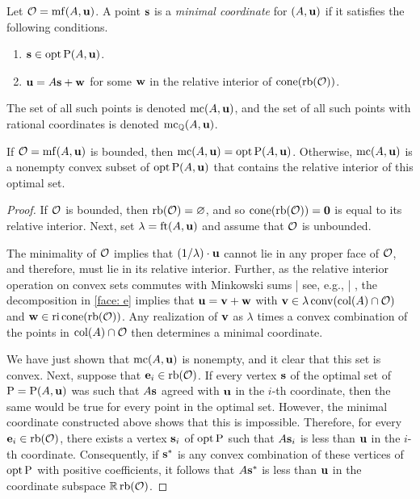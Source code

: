 \documentclass[11pt]{amsart}
\begin{document}
\begin{definition}
\label{mc: D} 
Let $\mathcal{O} = \operatorname{mf}(A, \mathbf{u})$.  A point $\mathbf{s}$ is a \emph{minimal coordinate} for $(A, \mathbf{u})$ if it satisfies the following conditions.
\begin{enumerate}
\item $\mathbf{s} \in \operatorname{opt} \mathrm{P}(A, \mathbf{u})$.
\item $\mathbf{u} = A \mathbf{s} + \mathbf{w}$ for some $\mathbf{w}$ in the relative interior of $\operatorname{cone} ( \operatorname{rb}(\mathcal{O}))$.  
\end{enumerate}

The set of all such points is denoted $\operatorname{mc}(A, \mathbf{u})$, and the set of all such points with rational coordinates is denoted $\operatorname{mc}_{\mathbb{Q}}(A, \mathbf{u})$.  
\end{definition}


\begin{proposition}  
\label{opt versus mc: P}  If $\mathcal{O} = \operatorname{mf}(A, \mathbf{u})$ is bounded, then $\operatorname{mc}(A, \mathbf{u}) = \operatorname{opt} \mathrm{P}(A, \mathbf{u})$.  Otherwise,  $\operatorname{mc}(A, \mathbf{u})$ is a nonempty convex subset of $\operatorname{opt} \mathrm{P}(A, \mathbf{u})$ that contains the relative interior of this optimal set. 
\end{proposition}

\begin{proof}    
If $\mathcal{O}$ is bounded, then $\operatorname{rb}(\mathcal{O}) = \varnothing$, and so $\operatorname{cone}( \operatorname{rb}(\mathcal{O})) = \mathbf{0}$ is equal to its relative interior.  Next, set $\lambda = \operatorname{ft}(A, \mathbf{u})$ and assume that $\mathcal{O}$ is unbounded.

 The minimality of $\mathcal{O}$ implies that $(1/\lambda)  \cdot \mathbf{u}$ cannot lie in any proper face of $\mathcal{O}$, and therefore, must lie in its relative interior.  Further, as the relative interior operation on convex sets commutes with Minkowski sums | see, e.g., \cite[Theorem 4.10(b)]{van-tiel.convex-analysis} | , the decomposition in \eqref{face: e}  implies that $\mathbf{u} = \mathbf{v} + \mathbf{w}$ with $\mathbf{v} \in \lambda \operatorname{conv}(\operatorname{col}(A) \cap \mathcal{O})$ and $\mathbf{w} \in \operatorname{ri} \operatorname{cone}(\operatorname{rb}(\mathcal{O}))$.  Any realization of $\mathbf{v}$ as $\lambda$ times a convex combination of the points in $\operatorname{col}(A) \cap \mathcal{O}$ then determines a minimal coordinate.

We have just shown that $\operatorname{mc}(A, \mathbf{u})$ is nonempty, and it clear that this set is convex.  Next,  suppose that $\mathbf{e}_i \in \operatorname{rb}(\mathcal{O})$.  If every vertex $\mathbf{s}$ of the optimal set of $\mathrm{P} = \mathrm{P}(A, \mathbf{u})$ was such that $A \mathbf{s}$ agreed with $\mathbf{u}$ in the $i$-th coordinate, then the same would be true for every point in the optimal set.   However, the minimal coordinate constructed above shows that this is impossible.  Therefore, for every $\mathbf{e}_i \in \operatorname{rb}(\mathcal{O})$, there exists a vertex $\mathbf{s}_i$ of $\operatorname{opt} \mathrm{P}$ such that $A \mathbf{s}_i$ is less than $\mathbf{u}$ in the $i$-th coordinate.  Consequently, if $\mathbf{s}^{\ast}$ is any convex combination of these vertices of $\operatorname{opt} \mathrm{P}$ with positive coefficients, it follows that $A \mathbf{s}^{\ast}$ is less than $\mathbf{u}$ in the coordinate subspace $\mathbb{R} \operatorname{rb}(\mathcal{O})$.  
\end{proof}
\end{document}

